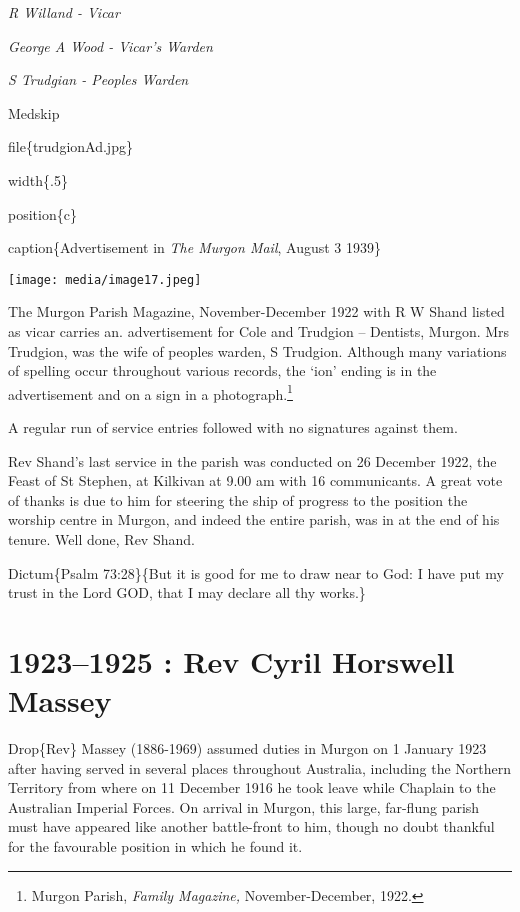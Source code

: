 \emph{R Willand - Vicar}

\emph{George A Wood - Vicar's Warden}

\emph{S Trudgian - Peoples Warden}

Medskip

file\{trudgionAd.jpg\}

width\{.5\}

position\{c\}

caption\{Advertisement in \emph{The Murgon Mail}, August 3 1939\}

\texttt{[image: media/image17.jpeg]}

The Murgon Parish Magazine, November-December 1922 with R W Shand listed as vicar carries an. advertisement for Cole and Trudgion -- Dentists, Murgon. Mrs Trudgion, was the wife of peoples warden, S Trudgion. Although many variations of spelling occur throughout various records, the `ion' ending is in the advertisement and on a sign in a photograph.\footnote{Murgon Parish, \emph{Family Magazine,} November-December, 1922.}

A regular run of service entries followed with no signatures against them.

Rev Shand's last service in the parish was conducted on 26 December 1922, the Feast of St Stephen, at Kilkivan at 9.00 am with 16 communicants. A great vote of thanks is due to him for steering the ship of progress to the position the worship centre in Murgon, and indeed the entire parish, was in at the end of his tenure. Well done, Rev Shand.

\begin{quote}
\end{quote}

Dictum\{Psalm 73:28\}\{But it is good for me to draw near to God: I have put my trust in the Lord GOD, that I may declare all thy works.\}

\hypertarget{rev-cyril-horswell-massey}{%
\chapter{1923--1925 : Rev Cyril Horswell Massey}\label{rev-cyril-horswell-massey}}

Drop\{Rev\} Massey (1886-1969) assumed duties in Murgon on 1 January 1923 after having served in several places throughout Australia, including the Northern Territory from where on 11 December 1916 he took leave while Chaplain to the Australian Imperial Forces. On arrival in Murgon, this large, far-flung parish must have appeared like another battle-front to him, though no doubt thankful for the favourable position in which he found it.

